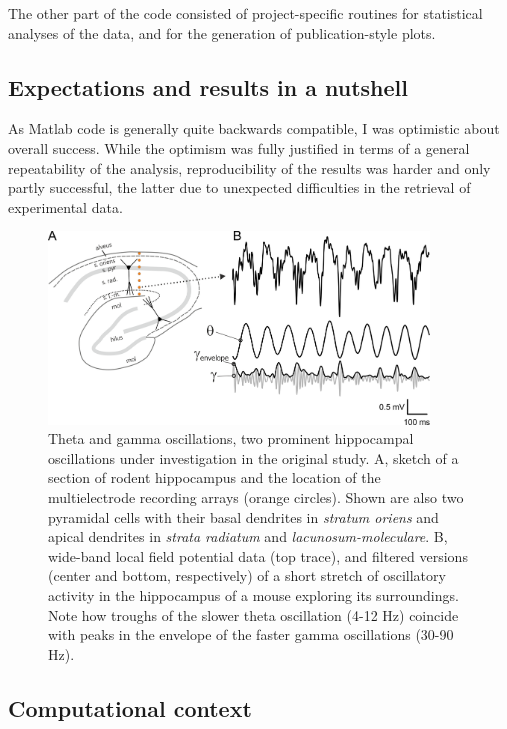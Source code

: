 The other part of the code consisted of project-specific routines for statistical analyses of the data, and for the generation of publication-style plots.

\subsection{Expectations and results in a nutshell}
As Matlab code is generally quite backwards compatible, I was optimistic about overall success. While the optimism was fully justified in terms of a general repeatability of the analysis, reproducibility of the results was harder and only partly successful, the latter due to unexpected difficulties in the retrieval of experimental data.

\begin{figure}
	\centering
	\includegraphics[width=0.9\textwidth]{figures/figures_tenYears_01.png}
	\caption{Theta and gamma oscillations, two prominent hippocampal oscillations under investigation in the original study. A, sketch of a section of rodent hippocampus and the location of the multielectrode recording arrays (orange circles). Shown are also two pyramidal cells with their basal dendrites in \textit{stratum oriens} and apical dendrites in \textit{strata radiatum} and \textit{lacunosum-moleculare}. B, wide-band local field potential data (top trace), and filtered versions (center and bottom, respectively) of a short stretch of oscillatory activity in the hippocampus of a mouse exploring its surroundings. Note how troughs of the slower theta oscillation (4-12 Hz) coincide with peaks in the envelope of the faster gamma oscillations (30-90 Hz).}
	\label{fig:hip_oscill}
\end{figure}


\subsection{Computational context}

